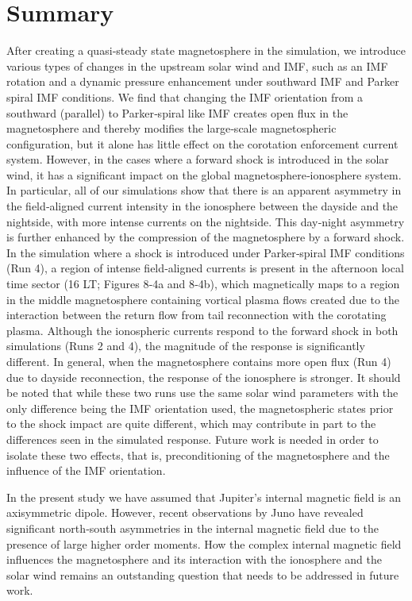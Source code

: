  

\section{Summary}
After creating a quasi‐steady state magnetosphere in the simulation, we introduce various types of changes in the upstream solar wind and IMF, such as an IMF rotation and a dynamic pressure enhancement under southward IMF and Parker spiral IMF conditions. We find that changing the IMF orientation from a southward (parallel) to Parker‐spiral like IMF creates open flux in the magnetosphere and thereby modifies the large‐scale magnetospheric configuration, but it alone has little effect on the corotation enforcement current system. However, in the cases where a forward shock is introduced in the solar wind, it has a significant impact on the global magnetosphere‐ionosphere system. In particular, all of our simulations show that there is an apparent asymmetry in the field‐aligned current intensity in the ionosphere between the dayside and the nightside, with more intense currents on the nightside. This day‐night asymmetry is further enhanced by the compression of the magnetosphere by a forward shock. In the simulation where a shock is introduced under Parker‐spiral IMF conditions (Run 4), a region of intense field‐aligned currents is present in the afternoon local time sector (16 LT; Figures 8‐4a and 8‐4b), which magnetically maps to a region in the middle magnetosphere containing vortical plasma flows created due to the interaction between the return flow from tail reconnection with the corotating plasma. Although the ionospheric currents respond to the forward shock in both simulations (Runs 2 and 4), the magnitude of the response is significantly different. In general, when the magnetosphere contains more open flux (Run 4) due to dayside reconnection, the response of the ionosphere is stronger. It should be noted that while these two runs use the same solar wind parameters with the only difference being the IMF orientation used, the magnetospheric states prior to the shock impact are quite different, which may contribute in part to the differences seen in the simulated response. Future work is needed in order to isolate these two effects, that is, preconditioning of the magnetosphere and the influence of the IMF orientation. 



In the present study we have assumed that Jupiter's internal magnetic field is an axisymmetric dipole. However, recent observations by Juno have revealed significant north‐south asymmetries in the internal magnetic field \cite{Connerney2018} due to the presence of large higher order moments. How the complex internal magnetic field influences the magnetosphere and its interaction with the ionosphere and the solar wind remains an outstanding question that needs to be addressed in future work. 